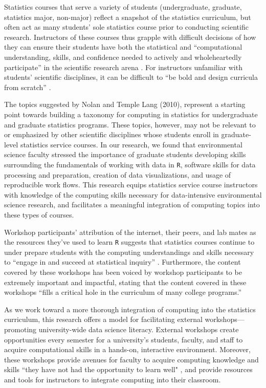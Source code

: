 \documentclass[12pt]{article}
\begin{document}
\quad Statistics courses that serve a variety of students (undergraduate, graduate, statistics major, non-major) reflect a snapshot of the statistics curriculum, but often act as many students' sole statistics course prior to conducting scientific research. Instructors of these courses thus grapple with difficult decisions of how they can ensure their students have both the statistical and ``computational understanding, skills, and confidence needed to actively and wholeheartedly participate'' in the scientific research arena \citep[p. 106]{nolan}. For instructors unfamiliar with students' scientific disciplines, it can be difficult to ``be bold and design curricula from scratch'' \citep[p. 106]{nolan}.  

\quad The topics suggested by Nolan and Temple Lang (2010), represent a starting point towards building a taxonomy for computing in statistics for undergraduate and graduate statistics programs. These topics, however, may not be relevant to or emphasized by other scientific disciplines whose students enroll in graduate-level statistics service courses.  In our research, we found that environmental science faculty stressed the importance of graduate students developing skills surrounding the fundamentals of working with data in \texttt{R}, software skills for data processing and preparation, creation of data visualizations, and usage of reproducible work flows. This research equips statistics service course instructors with knowledge of the computing skills necessary for data-intensive environmental science research, and facilitates a meaningful integration of computing topics into these types of courses.   

\quad Workshop participants' attribution of the internet, their peers, and lab mates as the resources they've used to learn \texttt{R} suggests that statistics courses continue to under prepare students with the computing understandings and skills necessary to ``engage in and succeed at statistical inquiry'' \citep[p. 97]{nolan}. Furthermore, the content covered by these workshops has been voiced by workshop participants to be extremely important and impactful, stating that the content covered in these workshops ``fills a critical hole in the curriculum of many college programs.'' 

\quad As we work toward a more thorough integration of computing into the statistics curriculum, this research offers a model for facilitating external workshops---promoting university-wide data science literacy. External workshops create opportunities every semester for a university's students, faculty, and staff to acquire computational skills in a hands-on, interactive environment. Moreover, these workshops provide avenues for faculty to acquire computing knowledge and skills ``they have not had the opportunity to learn well" \citep[p. 106]{nolan}, and provide resources and tools for instructors to integrate computing into their classroom.
\end{document}
